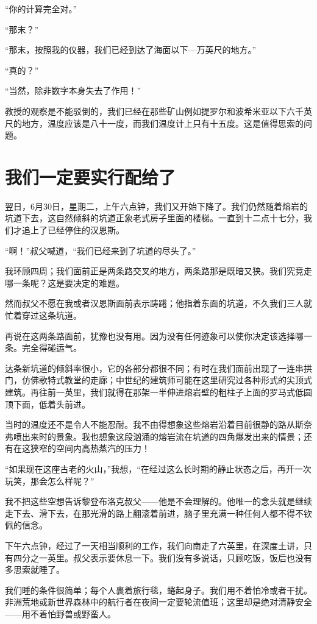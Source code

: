 \documentclass[10pt]{book}
\begin{document}
“你的计算完全对。”

“那末？”

“那末，按照我的仪器，我们已经到达了海面以下—万英尺的地方。”

“真的？”

“当然，除非数字本身失去了作用！”

教授的观察是不能驳倒的，我们已经在那些矿山例如提罗尔和波希米亚以下六千英尺的地方，温度应该是八十一度，而我们温度计上只有十五度。这是值得思索的问题。
\chapter{我们一定要实行配给了}
翌日，6月30日，星期二，上午六点钟，我们又开始下降了。我们仍然随着熔岩的坑道下去，这自然倾斜的坑道正象老式房子里面的楼梯。一直到十二点十七分，我们才追上了已经停住的汉恩斯。

“啊！”叔父喊道，“我们已经来到了坑道的尽头了。”

我环顾四周；我们面前正是两条路交叉的地方，两条路那是既暗又狭。我们究竞走哪一条呢？这是要决定的难题。

然而叔父不愿在我或者汉恩斯面前表示踌躇；他指着东面的坑道，不久我们三人就忙着穿过这条坑道。

再说在这两条路面前，犹豫也没有用。因为没有任何迹象可以使你决定该选择哪一条。完全得碰运气。

达条新坑道的倾斜率很小，它的各部分都很不同；有时在我们面前出现了一连串拱门，仿佛歌特式教堂的走廊；中世纪的建筑师可能在这里研究过各种形式的尖顶式建筑。再往前一英里，我们就得在那架一半伸进熔岩壁的粗柱子上面的罗马式低圆顶下面，低着头前进。

当时的温度还不是令人不能忍耐。我不由得想象这些熔岩沿着目前很静的路从斯奈弗喷出来时的景象。我也想象这段汹涌的熔岩流在坑道的四角爆发出来的情景；还有在这狭窄的空间内高热蒸汽的压力！

“如果现在这座古老的火山，”我想，“在经过这么长时期的静止状态之后，再开一次玩笑，那会怎么样呢？”

我不把这些空想告诉黎登布洛克叔父——他是不会理解的。他唯一的念头就是继续走下去、滑下去，在那光滑的路上翻滚着前进，脑子里充满一种任何人都不得不钦佩的信念。

下午六点钟，经过了一天相当顺利的工作，我们向南走了六英里，在深度土讲，只有四分之一英里。叔父表示要休息一下。我们没有多说话，只顾吃饭，饭后也没有多思索就睡了。

我们睡的条件很简单；每个人裹着旅行毯，蜷起身子。我们用不着怕冷或者干扰。非洲荒地或新世界森林中的航行者在夜间一定要轮流值班；这里却是绝对清静安全——用不着怕野兽或野蛮人。
\end{document}
